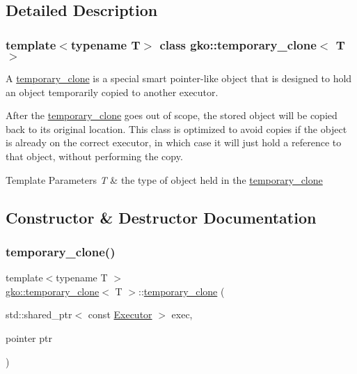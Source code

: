 \subsection{Detailed Description}
\subsubsection*{template$<$typename T$>$\newline
class gko\+::temporary\+\_\+clone$<$ T $>$}

A \hyperlink{classgko_1_1temporary__clone}{temporary\+\_\+clone} is a special smart pointer-\/like object that is designed to hold an object temporarily copied to another executor. 

After the \hyperlink{classgko_1_1temporary__clone}{temporary\+\_\+clone} goes out of scope, the stored object will be copied back to its original location. This class is optimized to avoid copies if the object is already on the correct executor, in which case it will just hold a reference to that object, without performing the copy.


\begin{DoxyTemplParams}{Template Parameters}
{\em T} & the type of object held in the \hyperlink{classgko_1_1temporary__clone}{temporary\+\_\+clone} \\
\hline
\end{DoxyTemplParams}


\subsection{Constructor \& Destructor Documentation}
\mbox{\label{classgko_1_1temporary__clone_a73b2e7db31555df95b827625f85da4be}} 
\subsubsection{\texorpdfstring{temporary\+\_\+clone()}{temporary\_clone()}}
{\footnotesize\ttfamily template$<$typename T $>$ \\
\hyperlink{classgko_1_1temporary__clone}{gko\+::temporary\+\_\+clone}$<$ T $>$\+::\hyperlink{classgko_1_1temporary__clone}{temporary\+\_\+clone} (\begin{DoxyParamCaption}\item[{std\+::shared\+\_\+ptr$<$ const \hyperlink{classgko_1_1Executor}{Executor} $>$}]{exec,  }\item[{pointer}]{ptr }\end{DoxyParamCaption})\hspace{0.3cm}{\ttfamily [explicit]}}



